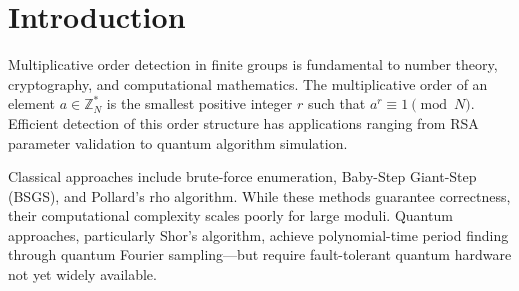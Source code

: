 \documentclass[conference]{IEEEtran}
\begin{document}
\begin{abstract}
We introduce \textbf{Vaca Resonance Analysis (VRA)}, a novel framework for spectral order detection based on phase-coherent averaging across multiplicative residues in $\mathbb{Z}_N$.
Unlike traditional Fourier or Ramanujan-based methods, which rely on additive harmonics or overcomplete dictionaries, VRA directly encodes \emph{multiplicative structure} and
exploits phase alignment within identical subgroup orders to achieve classical coherence analogous to quantum interference.

Across 62 test cases spanning composite and prime moduli, VRA achieves a mean precision of $0.516$ versus $0.156$ for the Ramanujan Periodicity Transform (RPT), corresponding
to $\Delta = +0.361$ (95\% CI [0.225, 0.494], permutation $p < 10^{-4}$).
VRA also provides a median $180\times$ runtime improvement due to its vectorized FFT kernels and order-aware harmonic reuse.

These results were validated through both bootstrap confidence intervals and non-parametric permutation tests, confirming three preregistered novelty criteria (overall precision,
high-SNR advantage, runtime speedup).
VRA thus represents a statistically validated advance in modular spectral analysis—bridging additive, multiplicative, and phase-coherent domains.
Its efficiency and coherence properties position it as a candidate classical analogue to quantum Fourier sampling, with potential applications spanning
cryptography, physics, and machine learning.
\end{abstract}


\section{Introduction}

Multiplicative order detection in finite groups is fundamental to number theory, cryptography, and computational mathematics. The multiplicative order of an element $a \in \mathbb{Z}_N^*$ is the smallest positive integer $r$ such that $a^r \equiv 1 \pmod{N}$. Efficient detection of this order structure has applications ranging from RSA parameter validation to quantum algorithm simulation.

Classical approaches include brute-force enumeration, Baby-Step Giant-Step (BSGS), and Pollard's rho algorithm\cite{pollard1978monte}. While these methods guarantee correctness, their computational complexity scales poorly for large moduli. Quantum approaches, particularly Shor's algorithm\cite{shor1997polynomial}, achieve polynomial-time period finding through quantum Fourier sampling—but require fault-tolerant quantum hardware not yet widely available.
\end{document}
